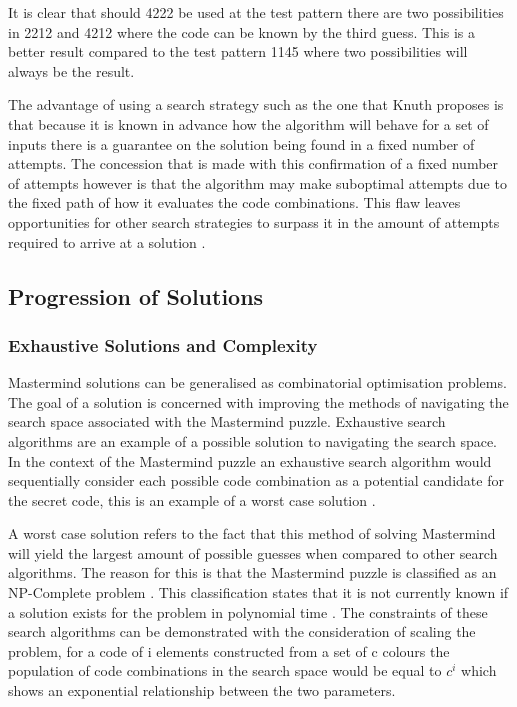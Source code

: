 \documentclass[11pt]{article}  %
\theoremstyle{definition}
\theoremstyle{remark}
\begin{document}
It is clear that should 4222 be used at the test pattern there are two possibilities in 2212 and 4212 where the code can be known by the third guess. This is a better result compared to the test pattern 1145 where two possibilities will always be the result.

The advantage of using a search strategy such as the one that Knuth proposes is that because it is known in advance how the algorithm will behave for a set of inputs there is a guarantee on the solution being found in a fixed number of attempts. The concession that is made with this confirmation of a fixed number of attempts however is that the algorithm may make suboptimal attempts due to the fixed path of how it evaluates the code combinations. This flaw leaves opportunities for other search strategies to surpass it in the amount of attempts required to arrive at a solution \cite {Haystack}.

\subsection {Progression of Solutions}

\subsubsection {Exhaustive Solutions and Complexity}

Mastermind solutions can be generalised as combinatorial optimisation problems. The goal of a solution is concerned with improving the methods of navigating the search space associated with the Mastermind puzzle. Exhaustive search algorithms are an example of a possible solution to navigating the search space. In the context of the Mastermind puzzle an exhaustive search algorithm would sequentially consider each possible code combination as a potential candidate for the secret code, this is an example of a worst case solution \cite {ExhaustiveDef}.

A worst case solution refers to the fact that this method of solving Mastermind will yield the largest amount of possible guesses when compared to other search algorithms. The reason for this is that the Mastermind puzzle is classified as an NP-Complete problem \cite{MMNP}. This classification states that it is not currently known if a solution exists for the problem in polynomial time \cite{NP}. The constraints of these search algorithms can be demonstrated with the consideration of scaling the problem, for a code of i elements constructed from a set of c colours the population of code combinations in the search space would be equal to $c^i$ which shows an exponential relationship between the two parameters.
\end{document}
